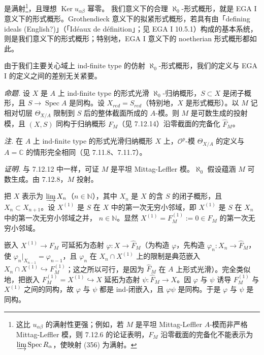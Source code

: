 是满射\footnote{这比 $u_{\alpha\beta}$ 的满射性更强；例如，若 $M$ 是平坦 Mittag-Leffler $A$-模而非严格 Mittag-Leffler 模，则 7.12.6 的论证表明，$F_M$ 沿零截面的完备化不能表示为 $\varinjlim\operatorname{Spec}R_{\alpha}$，使映射 (356) 为满射。}，且理想 $\operatorname{Ker}u_{\alpha\beta}$ 幂零。
我们意义下的合理 $\aleph_0$-形式概形，就是 EGA I 意义下的形式概形。Grothendieck 意义下的拟紧形式概形，若具有由「defining ideals (English?)」（「Idéaux de définition」；见 EGA I 10.5.1）构成的基本系统，则是我们意义下的形式概形；特别地，EGA I 意义下的 noetherian 形式概形都如此。

由于我们主要关心域上 ind-finite type 的仿射 $\aleph_0$-形式概形，我们的定义与 EGA I 的定义之间的差别无关紧要。

 \emph{命题.} 设 $X$ 是 $A$ 上 ind-finite type 的形式光滑 $\aleph_0$-归纳概形，$S\subset X$ 是闭子概形，且 $S\to\operatorname{Spec}A$ 是同构。设 $X_{red}=S_{red}$（特别地，$X$ 是形式概形）。以 $M$ 记相对切层 $\Theta_{X/A}$ 限制到 $S$ 后的整体截面所成的 $A$-模。则 $M$ 是可数生成的投射模，且 $(X,S)$ 同构于归纳概形 $F_M$（见 7.12.14）沿零截面的完备化 $\widehat F_M$。

\emph{注.} 在 $A$ 上 ind-finite type 的形式光滑归纳概形 $X$ 上，$\mathcal{O}^{p}$-模 $\Theta_{X/A}$ 的定义与 $A=\mathbb{C}$ 的情形完全相同（见 7.11.8、7.11.7）。

\emph{证明.} 与 7.12.12 中一样，可证 $M$ 是平坦 Mittag-Leffler 模。$\aleph_0$ 假设蕴涵 $M$ 可数生成。由 7.12.8，$M$ 投射。

把 $X$ 表示为 $\varinjlim X_n$（$n\in\mathbb{N}$），其中 $X_n$ 是 $X$ 的含 $S$ 的闭子概形，且 $X_n\subset X_{n+1}$。设 $X^{(1)}$ 是 $S$ 在 $X$ 中的第一次无穷小邻域，即 $X^{(1)}$ 是 $S$ 在 $X_n$ 中的第一次无穷小邻域之并，
%
$n\in\mathbb{N}$。显然 $X^{(1)}=F^{(1)}_{M}:=0\in F_M$ 的第一次无穷小邻域。

嵌入 $X^{(1)}\to F_M$ 可延拓为态射 $\varphi:X\to\widehat F_M$（为构造 $\varphi$，先构造 $\varphi_n:X_n\to\widehat F_M$，使 $\varphi_n|_{X_{n-1}}=\varphi_{n-1}$，且 $\varphi_n$ 在 $X_n\cap X^{(1)}$ 上的限制是典范嵌入 $X_n\cap X^{(1)}\hookrightarrow F^{(1)}_{M}$；这之所以可行，是因为 $\widehat F_M$ 在 $A$ 上形式光滑）。完全类似地，把嵌入 $F^{(1)}_{M}=X^{(1)}\hookrightarrow X$ 延拓为态射 $\psi:\widehat F_M\to X$。因 $\varphi$ 与 $\psi$ 诱导 $F^{(1)}_{M}$ 与 $X^{(1)}$ 之间的同构，故 $\varphi$ 与 $\psi$ 都是 ind-闭嵌入，且 $\varphi\psi$ 是同构。于是 $\varphi$ 与 $\psi$ 是同构。

